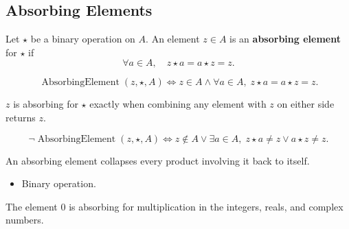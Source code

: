 \subsection{Absorbing Elements}
\label{subsec:absorbing-elements}

\begin{definition}
\label{def:absorbing-element}
Let $\star$ be a binary operation on $A$.
An element $z\in A$ is an \textbf{absorbing element} for $\star$ if
\[
\forall a\in A,\quad z\star a=a\star z=z.
\]
\end{definition}

\begin{remark*}
\[
\operatorname{AbsorbingElement}(z,\star,A)
\Longleftrightarrow
z\in A
\land
\forall a\in A,\; z\star a=a\star z=z.
\]
\end{remark*}

\begin{remark*}
$z$ is absorbing for $\star$ exactly when combining any element with $z$ on
either side returns $z$.
\end{remark*}

\begin{remark*}
\[
\neg\operatorname{AbsorbingElement}(z,\star,A)
\Longleftrightarrow
z\notin A
\lor
\exists a\in A,\; z\star a\neq z \lor a\star z\neq z.
\]
\end{remark*}

\begin{remark*}[Interpretation]
An absorbing element collapses every product involving it back to itself.
\end{remark*}

\begin{remark*}[Dependencies]
\begin{itemize}
  \item Binary operation.
\end{itemize}
\end{remark*}

\begin{remark*}[Examples]
The element $0$ is absorbing for multiplication in the integers, reals, and
complex numbers.
\end{remark*}
